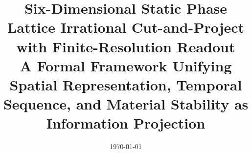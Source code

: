 \documentclass[11pt,letterpaper]{article}
\title{Six-Dimensional Static Phase Lattice Irrational Cut-and-Project with Finite-Resolution Readout\\\large A Formal Framework Unifying Spatial Representation, Temporal Sequence, and Material Stability as Information Projection}
\author{}
\date{\today}
\begin{document}
\maketitle
















\FloatBarrier
\appendix


\FloatBarrier

\end{document}
